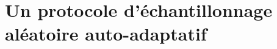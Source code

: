 
\chapter{Un protocole d'échantillonnage aléatoire auto-adaptatif}
\label{net:chap:spray}
\minitoc

















